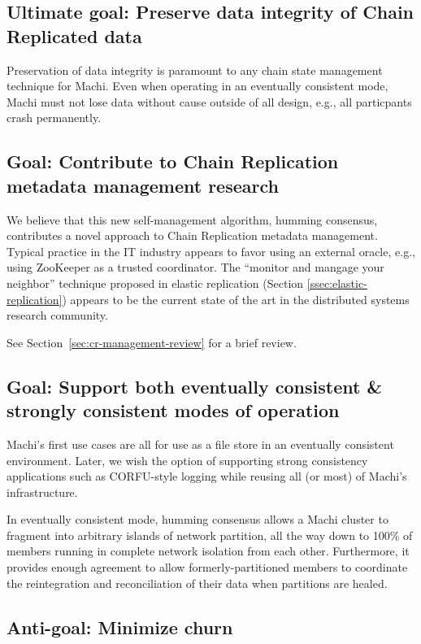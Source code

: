 \documentclass[preprint,10pt]{sigplanconf}
\begin{document}
\subsection{Ultimate goal: Preserve data integrity of Chain Replicated data}

Preservation of data integrity is paramount to any chain state
management technique for Machi.  Even when operating in an eventually
consistent mode, Machi must not lose data without cause outside of all
design, e.g., all particpants crash permanently.

\subsection{Goal: Contribute to Chain Replication metadata management research}

We believe that this new self-management algorithm, humming consensus,
contributes a novel approach to Chain Replication metadata management.
Typical practice in the IT industry appears to favor using an external
oracle, e.g., using ZooKeeper as a trusted coordinator.  The ``monitor
and mangage your neighbor'' technique proposed in elastic replication
(Section \ref{ssec:elastic-replication}) appears to be the current
state of the art in the distributed systems research community.

See Section~\ref{sec:cr-management-review} for a brief review.

\subsection{Goal: Support both eventually consistent \& strongly consistent modes of operation}

Machi's first use cases are all for use as a file store in an eventually
consistent environment.
Later, we wish the option of supporting strong consistency
applications such as CORFU-style logging while reusing all (or most)
of Machi's infrastructure.

In eventually consistent mode, humming consensus
allows a Machi cluster to fragment into
arbitrary islands of network partition, all the way down to 100\% of
members running in complete network isolation from each other.
Furthermore, it provides enough agreement to allow
formerly-partitioned members to coordinate the reintegration and
reconciliation of their data when partitions are healed.

\subsection{Anti-goal: Minimize churn}
\end{document}
